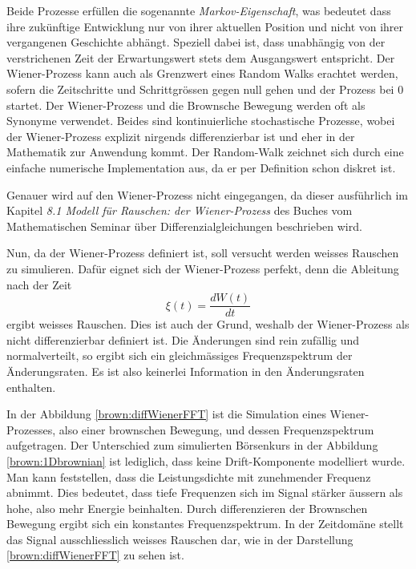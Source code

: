 Beide Prozesse erfüllen die sogenannte \textit{Markov-Eigenschaft}, was bedeutet dass ihre zukünftige Entwicklung nur von ihrer aktuellen Position und nicht von ihrer vergangenen Geschichte abhängt. Speziell dabei ist, dass unabhängig von der verstrichenen Zeit der Erwartungswert stets dem Ausgangswert entspricht. Der Wiener-Prozess kann auch als Grenzwert eines Random Walks erachtet werden, sofern die Zeitschritte und Schrittgrössen gegen null gehen und der Prozess bei 0 startet. Der Wiener-Prozess und die Brownsche Bewegung werden oft als Synonyme verwendet. Beides sind kontinuierliche stochastische Prozesse, wobei der Wiener-Prozess explizit nirgends differenzierbar ist und eher in der Mathematik zur Anwendung kommt. Der Random-Walk zeichnet sich durch eine einfache numerische Implementation aus, da er per Definition schon diskret ist.


Genauer wird auf den Wiener-Prozess nicht eingegangen, da dieser ausführlich im Kapitel \textit{8.1 Modell für Rauschen: der Wiener-Prozess} des Buches \cite{brown:Differenzialgleichungen} vom Mathematischen Seminar über Differenzialgleichungen beschrieben wird.


Nun, da der Wiener-Prozess definiert ist, soll versucht werden weisses Rauschen zu simulieren. Dafür eignet sich der Wiener-Prozess perfekt, denn die Ableitung nach der Zeit
\begin{equation}
	\xi(t) = \frac{dW(t)}{dt}
\end{equation}
ergibt weisses Rauschen. Dies ist auch der Grund, weshalb der Wiener-Prozess als nicht differenzierbar definiert ist. Die Änderungen sind rein zufällig und normalverteilt, so ergibt sich ein gleichmässiges Frequenzspektrum der Änderungsraten. Es ist also keinerlei Information in den Änderungsraten enthalten.


In der Abbildung \ref{brown:diffWienerFFT} ist die Simulation eines Wiener-Prozesses, also einer brownschen Bewegung, und dessen Frequenzspektrum aufgetragen. Der Unterschied zum simulierten Börsenkurs in der Abbildung \ref{brown:1Dbrownian} ist lediglich, dass keine Drift-Komponente modelliert wurde. Man kann feststellen, dass die Leistungsdichte mit zunehmender Frequenz abnimmt. Dies bedeutet, dass tiefe Frequenzen sich im Signal stärker äussern als hohe, also mehr Energie beinhalten. Durch differenzieren der Brownschen Bewegung ergibt sich ein konstantes Frequenzspektrum. In der Zeitdomäne stellt das Signal ausschliesslich weisses Rauschen dar, wie in der Darstellung \ref{brown:diffWienerFFT} zu sehen ist.

